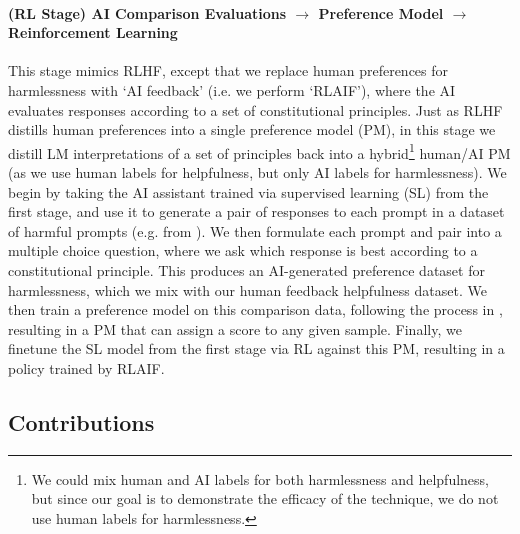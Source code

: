 \documentclass[english]{article}
\renewcommand\>{\rangle}
\begin{document}
\paragraph{(RL Stage) AI Comparison Evaluations $\to$ Preference Model $\to$ Reinforcement Learning}
This stage mimics RLHF, except that we replace human preferences for harmlessness with `AI feedback' (i.e. we perform `RLAIF'), where the AI evaluates responses according to a set of constitutional principles.  Just as RLHF distills human preferences into a single preference model (PM), in this stage we distill LM interpretations of a set of principles back into a hybrid\footnote{We could mix human and AI labels for both harmlessness and helpfulness, but since our goal is to demonstrate the efficacy of the technique, we do not use human labels for harmlessness. } human/AI PM (as we use human labels for helpfulness, but only AI labels for harmlessness).
We begin by taking the AI assistant trained via supervised learning (SL) from the first stage, and use it to generate a pair of responses to each prompt in a dataset of harmful prompts (e.g. from \cite{DeepRedTeaming}).  We then formulate each prompt and pair into a multiple choice question, where we ask which response is best  according to a constitutional principle.    This produces an AI-generated preference dataset for harmlessness, which we mix with our human feedback helpfulness dataset.  We then train a preference model on this comparison data, following  the process in \cite{bai2022training}, resulting in a PM that can assign a score to any given sample.  Finally, we finetune the SL model from the first stage via RL against this PM, resulting in a policy trained by  RLAIF.  


\subsection{Contributions}
\end{document}
